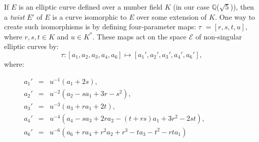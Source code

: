 If $E$ is an elliptic curve defined over a number field $K$ (in our case $\mathbb{Q}$($\sqrt{5}$)), then a \emph{twist} $E'$ of $E$ is a curve isomorphic to $E$ over some extension of $K$. One way to create such isomorphisms is by defining four-parameter maps: $\tau$ $= [r,s,t,u]$, where $r,s,t \in K$ and $u \in K^*$. These maps act on the space $\mathcal{E}$ of non-singular elliptic curves by: 
\begin{equation} \tau: [a_1, a_2, a_3, a_4, a_6] \mapsto [a_1', a_2', a_3', a_4', a_6'], \nonumber\end{equation}
where:

$\begin{array}{rrrrcl}
&&&a_1' &= & u^{-1}(a_1+2s), \nonumber \\
&&&a_2' &= &u^{-2}(a_2-sa_1+3r-s^2),\nonumber \\
&&&a_3' &= &u^{-3}(a_3+ra_1+2t),\nonumber\\
&&&a_4' &= &u^{-4}(a_4-sa_3+2ra_2-(t+rs)a_1+3r^2-2st),\nonumber\\
&&&a_6' &= &u^{-6}(a_6+ra_4+r^2a_2+r^3-ta_3-t^2-rta_1)\nonumber
\end{array}$

\

